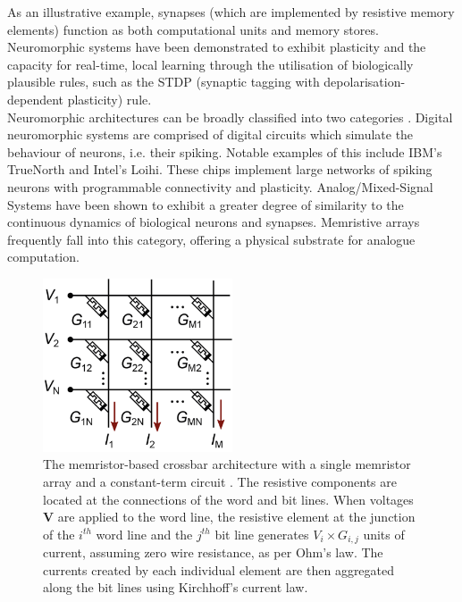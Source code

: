 \noindent As an illustrative example, synapses (which are implemented by resistive memory elements) function as both computational units and memory stores. Neuromorphic systems have been demonstrated to exhibit plasticity and the capacity for real-time, local learning through the utilisation of biologically plausible rules, such as the STDP (synaptic tagging with depolarisation-dependent plasticity) rule. \\

\noindent Neuromorphic architectures can be broadly classified into two categories \cite{ceolini2020hand}. Digital neuromorphic systems are comprised of digital circuits which simulate the behaviour of neurons, i.e. their spiking. Notable examples of this include IBM's TrueNorth and Intel's Loihi. These chips implement large networks of spiking neurons with programmable connectivity and plasticity. Analog/Mixed-Signal Systems have been shown to exhibit a greater degree of similarity to the continuous dynamics of biological neurons and synapses. Memristive arrays frequently fall into this category, offering a physical substrate for analogue computation.\\

\begin{figure}[htbp!] 
    \centering    
    \includegraphics[width=0.5\textwidth]{Chapter2/Figs/h.png}
    \caption[The memristor-based crossbar architecture.]{The memristor-based crossbar architecture with a single memristor array and a constant-term circuit \cite{truong2014new}. The resistive components are located at the connections of the word and bit lines. When voltages $\mathbf{V}$ are applied to the word line, the resistive element at the junction of the $i^{th}$ word line and the $j^{th}$ bit line generates $V_i \times G_{i,j}$ units of current, assuming zero wire resistance, as per Ohm's law. The currents created by each individual element are then aggregated along the bit lines using Kirchhoff's current law.}
    \label{fig:2h}
\end{figure}
    

